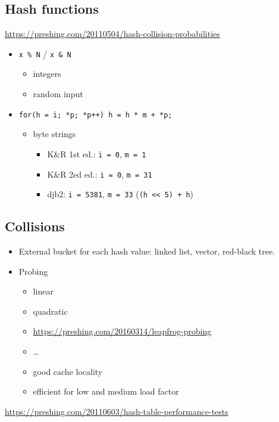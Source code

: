 \subsection{Hash functions}

\url{https://preshing.com/20110504/hash-collision-probabilities}

\begin{itemize}
    \item \texttt{x \% N} / \texttt{x \& N}
        \begin{itemize}
            \item integers
            \item random input
        \end{itemize}
    \item
        \texttt{for(h = i; *p; *p++) h = h * m + *p;}
        \begin{itemize}
            \item byte strings
            \begin{itemize}
                \item K\&R 1st ed.: \texttt{i = 0}, \texttt{m = 1}
                \item K\&R 2ed ed.: \texttt{i = 0}, \texttt{m = 31}
                \item
                    djb2: \texttt{i = 5381}, \texttt{m = 33}
                    (\texttt{(h << 5) + h})
            \end{itemize}
        \end{itemize}
\end{itemize}

\subsection{Collisions}

\begin{itemize}
    \item
        External bucket for each hash value: linked list, vector, red-black
        tree.
    \item Probing
        \begin{itemize}
            \item linear
            \item quadratic
            \item \url{https://preshing.com/20160314/leapfrog-probing}
            \item \ldots
            \item good cache locality
            \item efficient for low and medium load factor
        \end{itemize}
\end{itemize}

\url{https://preshing.com/20110603/hash-table-performance-tests}

